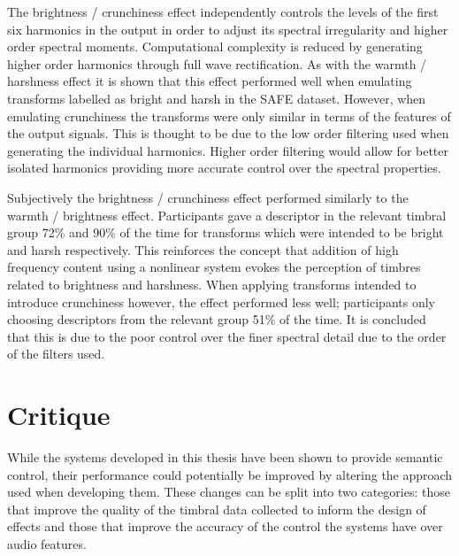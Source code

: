 	The brightness / crunchiness effect independently controls the levels of the first six harmonics in the output in
	order to adjust its spectral irregularity and higher order spectral moments. Computational complexity is reduced by
	generating higher order harmonics through full wave rectification. As with the warmth / harshness effect it is shown
	that this effect performed well when emulating transforms labelled as bright and harsh in the SAFE dataset. However,
	when emulating crunchiness the transforms were only similar in terms of the features of the output signals. This is
	thought to be due to the low order filtering used when generating the individual harmonics. Higher order filtering
	would allow for better isolated harmonics providing more accurate control over the spectral properties.

	Subjectively the brightness / crunchiness effect performed similarly to the warmth / brightness effect. Participants
	gave a descriptor in the relevant timbral group 72\% and 90\% of the time for transforms which were intended to be
	bright and harsh respectively. This reinforces the concept that addition of high frequency content using a nonlinear
	system evokes the perception of timbres related to brightness and harshness. When applying transforms intended to
	introduce crunchiness however, the effect performed less well; participants only choosing descriptors from the
	relevant group 51\% of the time. It is concluded that this is due to the poor control over the finer spectral detail
	due to the order of the filters used.

\section{Critique}
\label{sec:Conclusion-Critique}
	While the systems developed in this thesis have been shown to provide semantic control, their performance could
	potentially be improved by altering the approach used when developing them. These changes can be split into two
	categories: those that improve the quality of the timbral data collected to inform the design of effects and those
	that improve the accuracy of the control the systems have over audio features.

